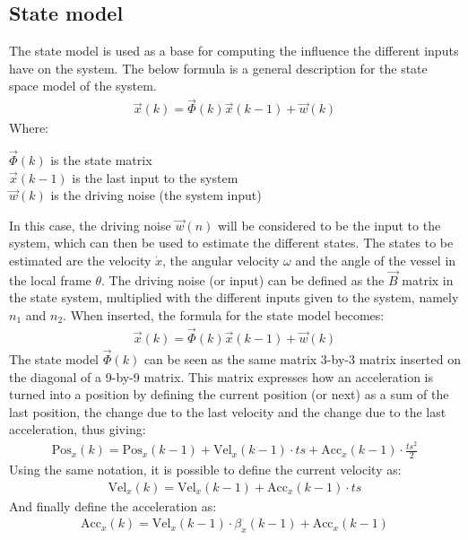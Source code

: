 \subsection{State model}
The state model is used as a base for computing the influence the different inputs have on the system. The below formula is a general description for the state space model of the system. 
\begin{align}
\vec{x}(k) = \vec{\Phi}(k)\vec{x}(k-1) + \vec{w}(k)
\end{align}
\noindent Where:
\begin{ffk}
$\vec{\Phi}(k)$ is the state matrix\\
$\vec{x}(k-1)$ is the last input to the system\\
$\vec{w}(k)$ is the driving noise (the system input)
\end{ffk}
In this case, the driving noise $\vec{w}(n)$ will be considered to be the input to the system, which can then be used to estimate the different states. The states to be estimated are the velocity $\dot{x}$, the angular velocity $\omega$ and the angle of the vessel in the local frame $\theta$. The driving noise (or input) can be defined as the $\vec{B}$ matrix in the state system, multiplied with the different inputs given to the system, namely $n_1$ and $n_2$. When inserted, the formula for the state model becomes:
\begin{align}
\vec{x}(k) = \vec{\Phi}(k)\vec{x}(k-1) + \vec{w}(k)
\end{align}
The state model $\vec{\Phi}(k)$ can be seen as the same matrix 3-by-3 matrix inserted on the diagonal of a 9-by-9 matrix. This matrix expresses how an acceleration is turned into a position by defining the current position (or next) as a sum of the last position, the change due to the last velocity and the change due to the last acceleration, thus giving:
\begin{align}
\text{Pos}_x(k) = \text{Pos}_x(k-1) + \text{Vel}_x(k-1)\cdot ts +  \text{Acc}_x(k-1) \cdot \frac{ts^2}{2}
\end{align}
Using the same notation, it is possible to define the current velocity as:
\begin{align}
\text{Vel}_x(k) = \text{Vel}_x(k-1) + \text{Acc}_x(k-1) \cdot ts 
\end{align}
And finally define the acceleration as:
\begin{align}
\text{Acc}_x(k) = \text{Vel}_x(k-1)\cdot \beta_x(k-1) + \text{Acc}_x(k-1)
\label{eq:accx}
\end{align}
